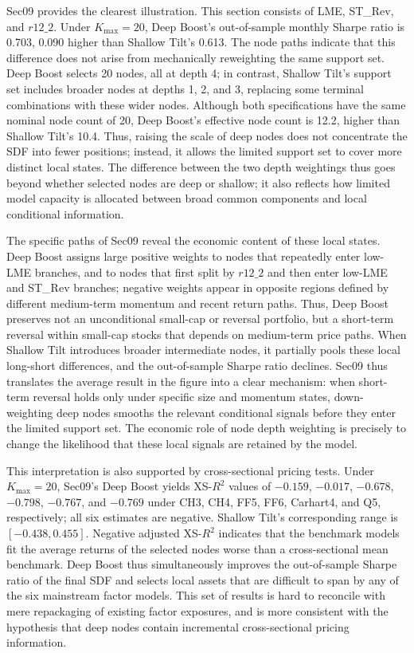 \documentclass[12pt]{article}
\begin{document}
Sec09 provides the clearest illustration. This section consists of LME, ST\_Rev, and \(r12\_2\). Under \(K_{\max}=20\), Deep Boost's out-of-sample monthly Sharpe ratio is 0.703, 0.090 higher than Shallow Tilt's 0.613. The node paths indicate that this difference does not arise from mechanically reweighting the same support set. Deep Boost selects 20 nodes, all at depth 4; in contrast, Shallow Tilt's support set includes broader nodes at depths 1, 2, and 3, replacing some terminal combinations with these wider nodes. Although both specifications have the same nominal node count of 20, Deep Boost's effective node count is 12.2, higher than Shallow Tilt's 10.4. Thus, raising the scale of deep nodes does not concentrate the SDF into fewer positions; instead, it allows the limited support set to cover more distinct local states. The difference between the two depth weightings thus goes beyond whether selected nodes are deep or shallow; it also reflects how limited model capacity is allocated between broad common components and local conditional information.

The specific paths of Sec09 reveal the economic content of these local states. Deep Boost assigns large positive weights to nodes that repeatedly enter low-LME branches, and to nodes that first split by \(r12\_2\) and then enter low-LME and ST\_Rev branches; negative weights appear in opposite regions defined by different medium-term momentum and recent return paths. Thus, Deep Boost preserves not an unconditional small-cap or reversal portfolio, but a short-term reversal within small-cap stocks that depends on medium-term price paths. When Shallow Tilt introduces broader intermediate nodes, it partially pools these local long-short differences, and the out-of-sample Sharpe ratio declines. Sec09 thus translates the average result in the figure into a clear mechanism: when short-term reversal holds only under specific size and momentum states, down-weighting deep nodes smooths the relevant conditional signals before they enter the limited support set. The economic role of node depth weighting is precisely to change the likelihood that these local signals are retained by the model.

This interpretation is also supported by cross-sectional pricing tests. Under \(K_{\max}=20\), Sec09's Deep Boost yields XS-\(R^2\) values of \(-0.159\), \(-0.017\), \(-0.678\), \(-0.798\), \(-0.767\), and \(-0.769\) under CH3, CH4, FF5, FF6, Carhart4, and Q5, respectively; all six estimates are negative. Shallow Tilt's corresponding range is \([-0.438,0.455]\). Negative adjusted XS-\(R^2\) indicates that the benchmark models fit the average returns of the selected nodes worse than a cross-sectional mean benchmark. Deep Boost thus simultaneously improves the out-of-sample Sharpe ratio of the final SDF and selects local assets that are difficult to span by any of the six mainstream factor models. This set of results is hard to reconcile with mere repackaging of existing factor exposures, and is more consistent with the hypothesis that deep nodes contain incremental cross-sectional pricing information.
\end{document}
